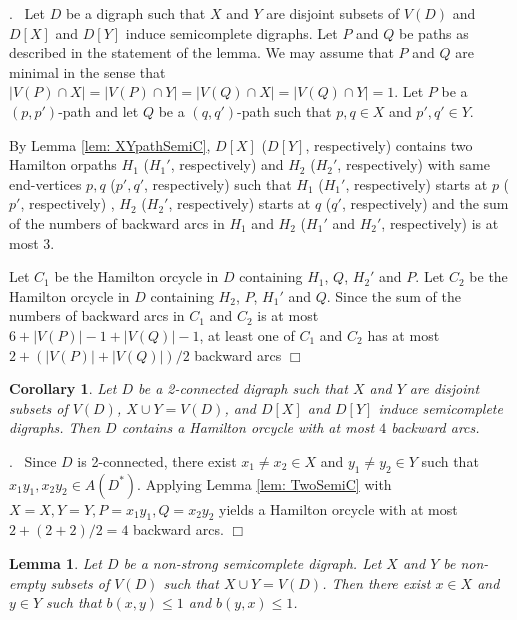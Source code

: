\documentclass{article}
\newcommand{\2}{\vspace{2mm}}
\renewenvironment{proof}[1][]{\par \noindent {\bf Proof#1}.\ }{\hfill$\Box$
\par \vspace{11pt}}
\newtheorem{lemma}[theorem]{Lemma}
\newtheorem{corollary}[theorem]{Corollary}
\theoremstyle{definition}
\begin{document}
\begin{proof}
Let $D$ be a digraph such that $X$ and $Y$ are disjoint subsets of $V(D)$ and $D[X]$ and $D[Y]$ induce semicomplete digraphs.
Let $P$ and $Q$ be paths as described in the statement of the lemma. 
We may assume that $P$ and $Q$ are minimal in the sense that $|V(P) \cap X|=|V(P) \cap Y|=|V(Q) \cap X|=|V(Q) \cap Y|=1$.
Let $P$ be a $(p,p')$-path and let $Q$ be a $(q,q')$-path such that $p,q\in X$ and $p',q'\in Y$.

By Lemma \ref{lem: XYpathSemiC}, $D[X]$ ($D[Y]$, respectively) contains two Hamilton orpaths $H_1$ ($H_1'$, respectively) and $H_2$ ($H_2'$, respectively) with same end-vertices $p,q$ ($p',q'$, respectively) such that $H_1$ ($H_1'$, respectively) starts at $p$ ($p'$, respectively) , $H_2$ ($H_2'$, respectively) starts at $q$ ($q'$, respectively) and the sum of the numbers of backward arcs in $H_1$ and $H_2$ ($H_1'$ and $H_2'$, respectively) is at most 3. 

Let $C_1$ be the Hamilton orcycle in $D$ containing $H_1$, $Q$, $H_2'$ and $P$. Let $C_2$ be the Hamilton orcycle in $D$ containing $H_2$, $P$, $H_1'$ and $Q$. Since the sum of the numbers of backward arcs in $C_1$ and $C_2$ is at most $6+ |V(P)|-1+|V(Q)|-1$, at least one of $C_1$ and $C_2$ has at most  $2 + (|V(P)|+|V(Q)|)/2$ backward arcs
\end{proof}

\begin{corollary}\label{cor: TwoSemiC}
Let $D$ be a 2-connected digraph such that $X$ and $Y$ are disjoint subsets of $V(D)$, $X \cup Y = V(D)$, and $D[X]$ and $D[Y]$ induce semicomplete digraphs. Then $D$ contains a Hamilton orcycle with at most $4$ backward arcs.  
\end{corollary}

\begin{proof}
Since $D$ is 2-connected, there exist $x_1 \neq x_2 \in X$ and $y_1 \neq y_2 \in Y$ such that $x_1y_1, x_2y_2 \in A(D^*)$. Applying Lemma \ref{lem: TwoSemiC} with $X=X, Y=Y, P=x_1y_1, Q=x_2y_2$ yields a Hamilton orcycle with at most $2+(2+2)/2=4$ backward arcs.
\end{proof}

\begin{lemma}\label{lem: FullUnionNonStrong}
Let $D$ be a non-strong semicomplete digraph. Let $X$ and $Y$ be non-empty subsets of $V(D)$ such that $X \cup Y = V(D)$. Then there exist $x \in X$ and $y \in Y$ such that $b(x,y) \le 1$ and $b(y,x) \le 1$.
\end{lemma}
\end{document}
